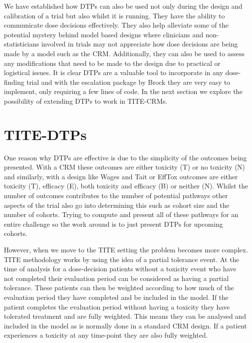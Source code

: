 We have established how DTPs can also be used not only during the design and calibration of a trial but also whilst it is running. They have the ability to communicate dose decisions effectively. They also help alleviate some of the potential mystery behind model based designs where clinicians and non-statisticians involved in trials may not appreciate how dose decisions are being made by a model such as the CRM. Additionally, they can also be used to assess any modifications that need to be made to the design due to practical or logistical issues. It is clear DTPs are a valuable tool to incorporate in any dose-finding trial and with the escalation package by Brock \cite{brockModularApproachDose2020} they are very easy to implement, only requiring a few lines of code. In the next section we explore the possibility of extending DTPs to work in TITE-CRMs.  


\section{TITE-DTPs}
\label{tite-dtp:TITE-DTPs}

One reason why DTPs are effective is due to the simplicity of the outcomes being presented. With a CRM these outcomes are either toxicity (T) or no toxicity (N) and similarly, with a design like Wages and Tait or EffTox outcomes are either toxicity (T), efficacy (E), both toxicity and efficacy (B) or neither (N). Whilst the number of outcomes contributes to the number of potential pathways other aspects of the trial also go into determining this such as cohort size and the number of cohorts. Trying to compute and present all of these pathways for an entire challenge so the work around is to just present DTPs for upcoming cohorts.  

However, when we move to the TITE setting the problem becomes more complex. TITE methodology works by using the idea of a partial tolerance event. At the time of analysis for a dose-decision patients without a toxicity event who have not completed their evaluation period can be considered as having a partial tolerance. These patients can then be weighted according to how much of the evaluation period they have completed and be included in the model. If the patient completes the evaluation period without having a toxicity they have tolerated treatment and are fully weighted. This means they can be analysed and included in the model as is normally done in a standard CRM design. If a patient experiences a toxicity at any time-point they are also fully weighted. 

